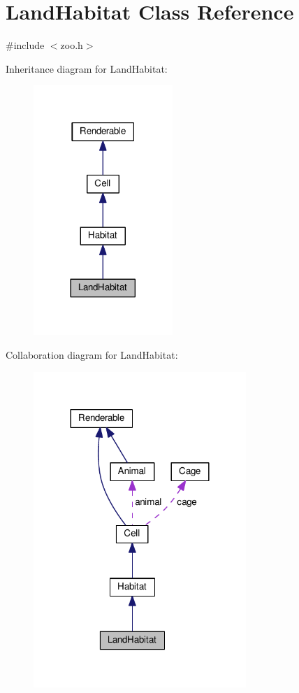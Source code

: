 \hypertarget{classLandHabitat}{}\section{Land\+Habitat Class Reference}
\label{classLandHabitat}


{\ttfamily \#include $<$zoo.\+h$>$}



Inheritance diagram for Land\+Habitat\+:
\nopagebreak
\begin{figure}[H]
\begin{center}
\leavevmode
\includegraphics[width=149pt]{classLandHabitat__inherit__graph}
\end{center}
\end{figure}


Collaboration diagram for Land\+Habitat\+:
\nopagebreak
\begin{figure}[H]
\begin{center}
\leavevmode
\includegraphics[width=228pt]{classLandHabitat__coll__graph}
\end{center}
\end{figure}
